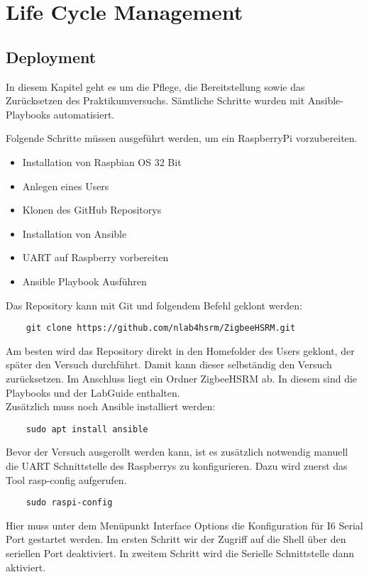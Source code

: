 \chapter{Life Cycle Management}
\section{Deployment}
In diesem Kapitel geht es um die Pflege, die Bereitstellung sowie das Zurücksetzen des Praktikumversuchs. Sämtliche Schritte wurden mit Ansible-Playbooks
automatisiert.

Folgende Schritte müssen ausgeführt werden, um ein RaspberryPi vorzubereiten.
\begin{itemize}
    \item Installation von Raspbian OS 32 Bit
    \item Anlegen eines Users
    \item Klonen des GitHub Repositorys 
    \item Installation von Ansible
    \item UART auf Raspberry vorbereiten
    \item Ansible Playbook Ausführen
\end{itemize}

Das Repository kann mit Git und folgendem Befehl geklont werden:
\begin{lstlisting}
    git clone https://github.com/nlab4hsrm/ZigbeeHSRM.git
\end{lstlisting}
Am besten wird das Repository direkt in den Homefolder des Users geklont, der später den Versuch durchführt. Damit kann dieser selbständig den Versuch zurücksetzen. Im Anschluss liegt ein Ordner
\grqq ZigbeeHSRM\grqq{} ab. In diesem sind die Playbooks und der LabGuide enthalten.\\
Zusätzlich muss noch Ansible installiert werden:
\begin{lstlisting}
    sudo apt install ansible
\end{lstlisting}

Bevor der Versuch ausgerollt werden kann, ist es zusätzlich notwendig manuell die UART Schnittstelle des Raspberrys zu konfigurieren. Dazu wird zuerst das Tool rasp-config aufgerufen.
\begin{lstlisting}
    sudo raspi-config
\end{lstlisting}
Hier muss unter dem Menüpunkt  Interface Options\grqq{} die Konfiguration für \grqq I6 Serial Port\grqq{} gestartet werden. Im ersten Schritt wir der Zugriff auf die Shell über den seriellen
Port deaktiviert. In zweitem Schritt wird die Serielle Schnittstelle dann aktiviert. 


